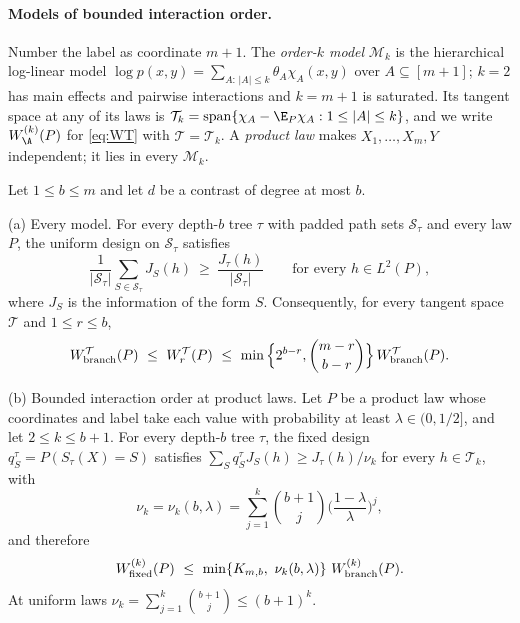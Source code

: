 \paragraph{Models of bounded interaction order.}
Number the label as coordinate $m+1$. The \emph{order-$k$ model}
$\mathcal M_k$ is the hierarchical log-linear model
$\log p(x,y)=\sum_{A:\,|A|\le k}\theta_A\chi_A(x,y)$ over
$A\subseteq[m+1]$; $k=2$ has main effects and pairwise interactions and
$k=m+1$ is saturated. Its tangent space at any of its laws is
$\mathcal T_k=\mathrm{span}\{\chi_A-\E_P\chi_A:1\le|A|\le k\}$, and we write
$W^{(k)}_\A(P)$ for \eqref{eq:WT} with $\mathcal T=\mathcal T_k$. A
\emph{product law} makes $X_1,\ldots,X_m,Y$ independent; it lies in every
$\mathcal M_k$.

\begin{theorem}\label{thm:structuredfull}
Let $1\le b\le m$ and let $d$ be a contrast of degree at most $b$.

\textup{(a) Every model.} For every depth-$b$ tree $\tau$ with padded path
sets $\mathcal S_\tau$ and every law $P$, the uniform design on
$\mathcal S_\tau$ satisfies
\begin{equation}
 \frac1{|\mathcal S_\tau|}\sum_{S\in\mathcal S_\tau}J_S(h)\ \ge\ \frac{J_\tau(h)}{|\mathcal S_\tau|}
 \qquad\text{for every }h\in L^2(P),\label{eq:infodom}
\end{equation}
where $J_S$ is the information of the form $S$. Consequently, for every
tangent space $\mathcal T$ and $1\le r\le b$,
\[
 W^{\mathcal T}_{\rm branch}(P)\ \le\ W^{\mathcal T}_r(P)\ \le\ \min\Big\{2^{b-r},\binom{m-r}{b-r}\Big\}\,W^{\mathcal T}_{\rm branch}(P).
\]

\textup{(b) Bounded interaction order at product laws.} Let $P$ be a product
law whose coordinates and label take each value with probability at least
$\lambda\in(0,1/2]$, and let $2\le k\le b+1$. For every depth-$b$ tree
$\tau$, the fixed design $q^\tau_S=P(S_\tau(X)=S)$ satisfies
$\sum_Sq^\tau_SJ_S(h)\ge J_\tau(h)/\nu_k$ for every $h\in\mathcal T_k$,
with
\[
 \nu_k=\nu_k(b,\lambda)=\sum_{j=1}^{k}\binom{b+1}{j}\Big(\frac{1-\lambda}{\lambda}\Big)^{j},
\]
and therefore
\[
 W^{(k)}_{\rm fixed}(P)\ \le\ \min\{K_{m,b},\ \nu_k(b,\lambda)\}\ W^{(k)}_{\rm branch}(P).
\]
At uniform laws $\nu_k=\sum_{j=1}^k\binom{b+1}{j}\le(b+1)^k$.


\end{theorem}
